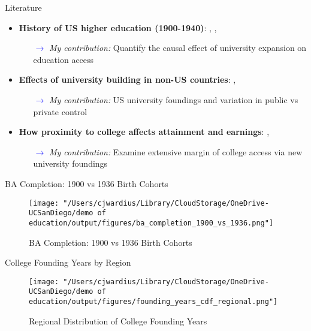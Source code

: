 \documentclass[notes,11pt, aspectratio=169]{beamer}
\begin{document}
\begin{frame}{Literature}
  \begin{itemize}
    \item \textbf{History of US higher education (1900-1940)}: \cite{goldinAmericasGraduationHigh1998}, \cite{goldinOriginsStateLevelDifferences1998}, \cite{goldinHumanCapitalCenturyAmerican2001}
    \begin{itemize}
      \item[\textcolor{blue}{$\rightarrow$}] \textit{My contribution:} Quantify the causal effect of university expansion on education access
    \end{itemize}

    \item \textbf{Effects of university building in non-US countries}: \cite{dufloSchoolingLaborMarket2001}, \cite{nimier-davidLocalHumanCapital2023}
    \begin{itemize}
      \item[\textcolor{blue}{$\rightarrow$}] \textit{My contribution:} US university foundings and variation in public vs private control
    \end{itemize}

    \item \textbf{How proximity to college affects attainment and earnings}: \cite{cardUsingGeographicVariation1993}, \cite{actonDistanceDegreesHow2025}
    \begin{itemize}
      \item[\textcolor{blue}{$\rightarrow$}] \textit{My contribution:} Examine extensive margin of college access via new university foundings
    \end{itemize}
  \end{itemize}
\end{frame}


\begin{frame}{BA Completion: 1900 vs 1936 Birth Cohorts}
    \begin{figure}
        \centering
        \texttt{[image: "/Users/cjwardius/Library/CloudStorage/OneDrive-UCSanDiego/demo of education/output/figures/ba\_completion\_1900\_vs\_1936.png"]}
        \caption{BA Completion: 1900 vs 1936 Birth Cohorts}
    \end{figure}
\end{frame}

\begin{frame}{College Founding Years by Region}
    \begin{figure}
        \centering
        \texttt{[image: "/Users/cjwardius/Library/CloudStorage/OneDrive-UCSanDiego/demo of education/output/figures/founding\_years\_cdf\_regional.png"]}
        \caption{Regional Distribution of College Founding Years}
    \end{figure}
\end{frame}
\end{document}
